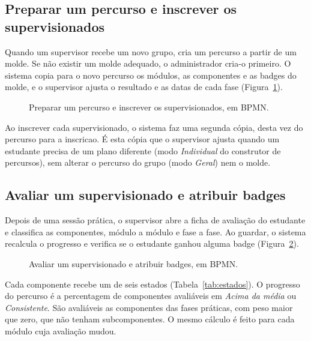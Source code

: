 \subsection{Preparar um percurso e inscrever os supervisionados}

Quando um supervisor recebe um novo grupo, cria um percurso a partir de um \gls{molde}. Se não existir um molde adequado, o administrador cria-o primeiro. O sistema copia para o novo percurso os módulos, as componentes e as badges do molde, e o supervisor ajusta o resultado e as datas de cada fase (Figura~\ref{fig:bpmn-percurso}).

\begin{figure}
    \centering
    \caption{Preparar um percurso e inscrever os supervisionados, em BPMN.}
    \label{fig:bpmn-percurso}
\end{figure}

Ao inscrever cada supervisionado, o sistema faz uma segunda cópia, desta vez do percurso para a \gls{inscricao}. É esta cópia que o supervisor ajusta quando um estudante precisa de um plano diferente (modo \emph{Individual} do construtor de percursos), sem alterar o percurso do grupo (modo \emph{Geral}) nem o molde.

\subsection{Avaliar um supervisionado e atribuir badges}

Depois de uma sessão prática, o supervisor abre a ficha de avaliação do estudante e classifica as componentes, módulo a módulo e fase a fase. Ao guardar, o sistema recalcula o progresso e verifica se o estudante ganhou alguma \gls{badge} (Figura~\ref{fig:bpmn-avaliacao}).

\begin{figure}
    \centering
    \caption{Avaliar um supervisionado e atribuir badges, em BPMN.}
    \label{fig:bpmn-avaliacao}
\end{figure}

Cada componente recebe um de seis estados (Tabela~\ref{tab:estados}). O progresso do percurso é a percentagem de componentes avaliáveis em \emph{Acima da média} ou \emph{Consistente}. São avaliáveis as componentes das fases práticas, com peso maior que zero, que não tenham subcomponentes. O mesmo cálculo é feito para cada módulo cuja avaliação mudou.

